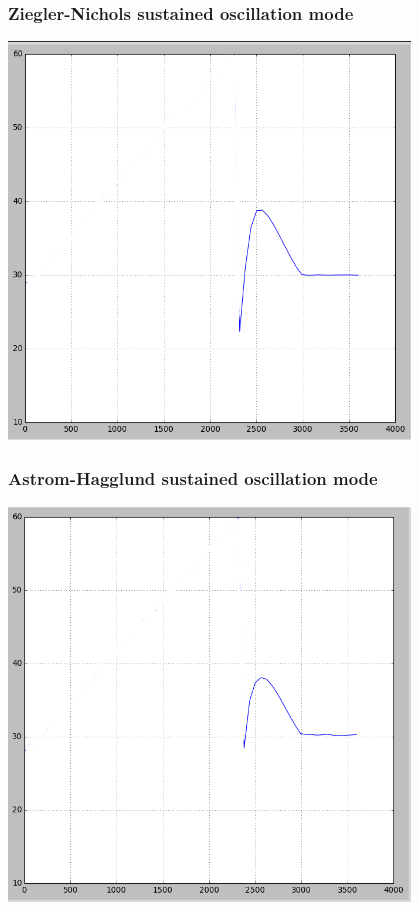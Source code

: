 \documentclass{beamer}
\begin{document}
\begin{frame}
\frametitle{Ziegler-Nichols sustained oscillation mode}
\includegraphics[width=0.8\textwidth]{../images/exp_gain100}~
\end{frame}

\begin{frame}
\frametitle{Astrom-Hagglund sustained oscillation mode}
\includegraphics[width=0.8\textwidth]{../images/exp_relay}~
\end{frame}
\end{document}
